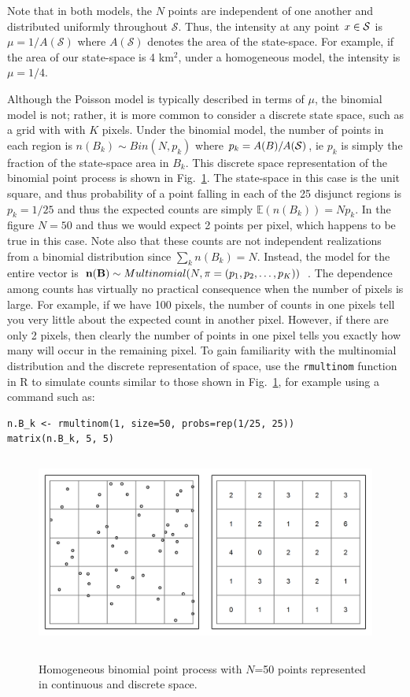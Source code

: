 Note that in both models, the $N$ points are independent
of one another and distributed uniformly
throughout $\mathcal{S}$. Thus, the intensity at any point $x \in
\cal{S}$ is $\mu = 1 / A(\mathcal{S})$ where $A(\mathcal{S})$ denotes
the area of the state-space. For example, if the area of our
state-space is 4 km$^2$,
under a homogeneous model, the intensity is $\mu = 1/4$.

Although the Poisson model is typically described in terms of $\mu$,
the binomial model is not; rather, it
is more common to consider a discrete state space, such as a grid with
with $K$ pixels. Under the binomial model, the number of points in
each region is $n(B_k) \sim Bin(N, p_k)$
where $p_k = A(B)/A(\cal{S})$, ie $p_k$ is simply the fraction of
the state-space area in $B_k$. This discrete space representation of
the binomial point process is shown in Fig.~\ref{ch9:fig:homo}. The
state-space in this case is the unit square, and thus probability of a
point falling in each of the 25 disjunct regions is $p_k = 1/25$ and
thus the expected counts are simply $\mathbb{E}(n(B_k)) = Np_k$. In
the figure $N=50$ and thus we would expect 2 points per pixel, which
happens to be true in this case. Note also that these counts are not
independent realizations from a binomial distribution since $\sum_k
n(B_k) = N$. Instead, the model for the entire vector 
is ${\bf n(B)} \sim Multinomial(N, {\mathbf{\pi}} = (p_1, p_2, \dots,
p_K))$ \citep{illian:2008}. The dependence among counts has virtually
no practical consequence when the number of pixels is large. For
example, if we have 100 pixels, the number of counts in one pixels
tell you very little about the expected count in another
pixel. However, if there are only 2 pixels, then clearly the number of
points in one pixel tells you exactly how many will occur in the
remaining pixel. To gain familiarity with the multinomial distribution
and the discrete representation of space, use the \verb+rmultinom+
function in R to simulate counts similar to those shown in
Fig.~\ref{ch9:fig:homo}, for example using a command 
such as:

\begin{verbatim}
n.B_k <- rmultinom(1, size=50, probs=rep(1/25, 25))
matrix(n.B_k, 5, 5)
\end{verbatim}


\begin{figure}
\centering
\includegraphics[width=5in,height=2.5in]{figs/homoPlots}
\label{ch9:fig:homo}
\caption{Homogeneous binomial point process with $N$=50 points
  represented in continuous and discrete space.}
\end{figure}


